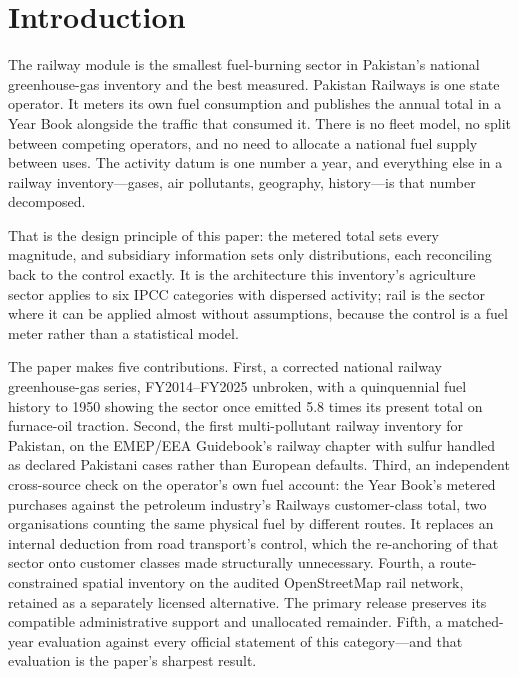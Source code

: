 \section{Introduction}
\label{sec:intro}

The railway module is the smallest fuel-burning sector in Pakistan's national
greenhouse-gas inventory and the best measured. Pakistan Railways is one state operator. It
meters its own fuel consumption and publishes the annual total in a Year Book alongside the
traffic that consumed it. There is no fleet model, no split between competing operators,
and no need to allocate a national fuel supply between uses. The activity datum is one
number a year, and everything else in a railway inventory---gases, air pollutants,
geography, history---is that number decomposed.

That is the design principle of this paper: the metered total sets every magnitude, and
subsidiary information sets only distributions, each reconciling back to the control
exactly. It is the architecture this inventory's agriculture sector applies to six IPCC
categories with dispersed activity; rail is the sector where it can be applied almost
without assumptions, because the control is a fuel meter rather than a statistical model.

The paper makes five contributions. First, a corrected national railway greenhouse-gas
series, FY2014--FY2025 unbroken, with a quinquennial fuel history to 1950 showing the
sector once emitted \num{5.8} times its present total on furnace-oil traction. Second, the first
multi-pollutant railway inventory for Pakistan, on the EMEP/EEA Guidebook's railway chapter
with sulfur handled as declared Pakistani cases rather than European defaults. Third, an
independent cross-source check on the operator's own fuel account: the Year Book's metered
purchases against the petroleum industry's Railways customer-class total, two organisations
counting the same physical fuel by different routes. It replaces an internal deduction from
road transport's control, which the re-anchoring of that sector onto customer classes made
structurally unnecessary. Fourth, a route-constrained spatial inventory
on the audited OpenStreetMap rail network, retained as a separately licensed alternative. The primary release preserves its compatible administrative support and unallocated remainder. Fifth, a matched-year evaluation against every
official statement of this category---and that evaluation is the paper's sharpest result.

